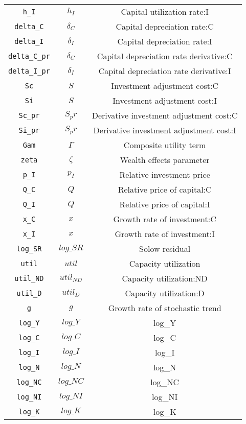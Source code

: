 \begin{center}
\begin{longtable}{ccc}
\texttt{h\_I} & ${h_I}$ & Capital utilization rate:I\\
\texttt{delta\_C} & ${\delta_C}$ & Capital depreciation rate:C\\
\texttt{delta\_I} & ${\delta_I}$ & Capital depreciation rate:I\\
\texttt{delta\_C\_pr} & ${\delta_C}$ & Capital depreciation rate derivative:C\\
\texttt{delta\_I\_pr} & ${\delta_I}$ & Capital depreciation rate derivative:I\\
\texttt{Sc} & $S$ & Investment adjustment cost:C\\
\texttt{Si} & $S$ & Investment adjustment cost:I\\
\texttt{Sc\_pr} & $S_pr$ & Derivative investment adjustment cost:C\\
\texttt{Si\_pr} & $S_pr$ & Derivative investment adjustment cost:I\\
\texttt{Gam} & ${\Gamma}$ & Composite utility term\\
\texttt{zeta} & ${\zeta}$ & Wealth effects parameter\\
\texttt{p\_I} & ${p_I}$ & Relative investment price\\
\texttt{Q\_C} & ${Q}$ & Relative price of capital:C\\
\texttt{Q\_I} & ${Q}$ & Relative price of capital:I\\
\texttt{x\_C} & ${x}$ & Growth rate of investment:C\\
\texttt{x\_I} & ${x}$ & Growth rate of investment:I\\
\texttt{log\_SR} & $log\_SR$ & Solow residual\\
\texttt{util} & ${util}$ & Capacity utilization\\
\texttt{util\_ND} & ${util_{ND}}$ & Capacity utilization:ND\\
\texttt{util\_D} & ${util_D}$ & Capacity utilization:D\\
\texttt{g} & ${g}$ & Growth rate of stochastic trend\\
\texttt{log\_Y} & $log\_Y$ & log\_Y\\
\texttt{log\_C} & $log\_C$ & log\_C\\
\texttt{log\_I} & $log\_I$ & log\_I\\
\texttt{log\_N} & $log\_N$ & log\_N\\
\texttt{log\_NC} & $log\_NC$ & log\_NC\\
\texttt{log\_NI} & $log\_NI$ & log\_NI\\
\texttt{log\_K} & $log\_K$ & log\_K\\

\end{longtable}
\end{center}
